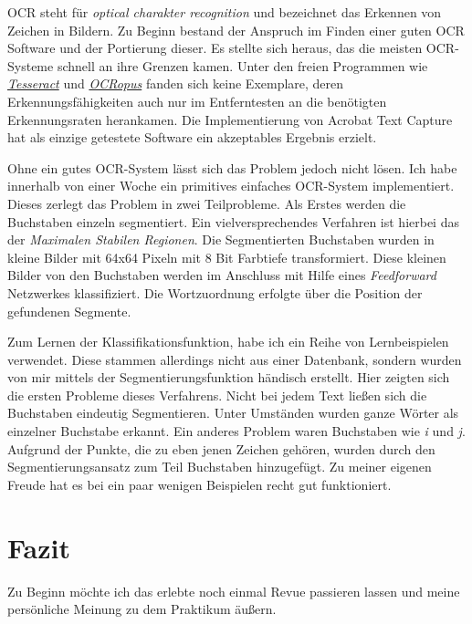 \documentclass[12pt]{article}
\begin{document}
OCR steht für \textit{optical charakter recognition} und bezeichnet das Erkennen von Zeichen in Bildern.
Zu Beginn bestand der Anspruch im Finden einer guten OCR Software und der Portierung dieser.
Es stellte sich heraus, das die meisten OCR-Systeme schnell an ihre Grenzen kamen. 
Unter den freien Programmen wie \href{http://code.google.com/p/tesseract-ocr/}{\textit{Tesseract}} und \href{http://code.google.com/p/ocropus/}{\textit{OCRopus}} fanden sich keine Exemplare, deren Erkennungsfähigkeiten
auch nur im Entferntesten an die benötigten Erkennungsraten herankamen.
Die Implementierung von Acrobat Text Capture hat als einzige getestete Software ein akzeptables Ergebnis erzielt.

Ohne ein gutes OCR-System lässt sich das Problem jedoch nicht lösen. Ich habe innerhalb von einer Woche ein primitives
einfaches OCR-System implementiert. Dieses zerlegt das Problem in zwei Teilprobleme. Als Erstes werden die Buchstaben
einzeln segmentiert. Ein vielversprechendes Verfahren ist hierbei das der \textit{Maximalen Stabilen Regionen}. 
Die Segmentierten Buchstaben wurden in kleine Bilder mit 64x64 Pixeln mit 8 Bit Farbtiefe transformiert.
Diese kleinen Bilder von den Buchstaben werden im Anschluss mit Hilfe eines \textit{Feedforward} Netzwerkes klassifiziert.
Die Wortzuordnung erfolgte über die Position der gefundenen Segmente.

Zum Lernen der Klassifikationsfunktion, habe ich ein Reihe von Lernbeispielen verwendet. Diese stammen allerdings nicht
aus einer Datenbank, sondern wurden von mir mittels der Segmentierungsfunktion händisch erstellt. Hier zeigten sich
die ersten Probleme dieses Verfahrens. Nicht bei jedem Text ließen sich die Buchstaben eindeutig Segmentieren. Unter
Umständen wurden ganze Wörter als einzelner Buchstabe erkannt. Ein anderes Problem waren Buchstaben wie \textit{i}
und \textit{j}. Aufgrund der Punkte, die zu eben jenen Zeichen gehören, wurden durch den Segmentierungsansatz zum Teil Buchstaben
hinzugefügt. Zu meiner eigenen Freude hat es bei ein paar wenigen Beispielen recht gut funktioniert.

\section{Fazit}

Zu Beginn möchte ich das erlebte noch einmal Revue passieren lassen und meine persönliche Meinung zu dem Praktikum äußern.
\end{document}
